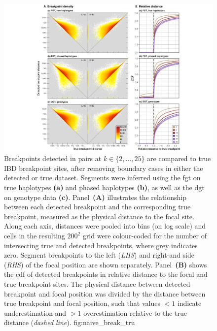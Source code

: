 

\begin{figure}[!htbp]
\includegraphics[width=\textwidth]{./img/ch3/naive_break_tru.pdf}
{Breakpoints detected in \fk{} pairs at ${k \in \lbrace 2, \ldots, 25 \rbrace}$ are compared to true IBD breakpoint sites, after removing boundary cases in either the detected or true dataset.
Segments were inferred using the \gls{fgt} on true haplotypes \textbf{(a)} and phased haplotypes \textbf{(b)}, as well as the \gls{dgt} on genotype data \textbf{(c)}.
Panel~\textbf{(A)} illustrates the relationship between each detected breakpoint and the corresponding true breakpoint, measured as the physical distance to the focal site.
Along each axis, distances were pooled into  bins (on log scale)
and cells in the resulting $200^2$ grid were colour-coded for the number of  intersecting true and detected breakpoints, where grey indicates zero.
Segment breakpoints to the left (\emph{LHS}) and right-and side (\emph{RHS}) of the focal position are shown separately.
Panel~\textbf{(B)} shows the \gls{cdf} of detected breakpoints in relative distance to the focal and true breakpoint sites.
The physical distance between detected breakpoint and focal position was divided by the distance between true breakpoint and focal position, such that values $<1$ indicate underestimation and $>1$ overestimation relative to the true distance (\emph{dashed line}).}
{fig:naive_break_tru}
\end{figure}
